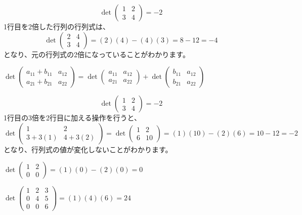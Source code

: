 \begin{ex}
	\[\det\begin{pmatrix} 1 & 2 \\ 3 & 4 \end{pmatrix} = -2\]
    1行目を2倍した行列の行列式は、
    \[\det\begin{pmatrix} 2 & 4 \\ 3 & 4 \end{pmatrix} = (2)(4)-(4)(3) = 8-12=-4\]
    となり、元の行列式の2倍になっていることがわかります。
\end{ex}

\begin{ex}
    $\det\begin{pmatrix} a_{11}+b_{11} & a_{12} \\ a_{21}+b_{21} & a_{22} \end{pmatrix} = \det\begin{pmatrix} a_{11} & a_{12} \\ a_{21} & a_{22} \end{pmatrix} + \det\begin{pmatrix} b_{11} & a_{12} \\ b_{21} & a_{22} \end{pmatrix}$
\end{ex}

\begin{ex}
    \[\det\begin{pmatrix} 1 & 2 \\ 3 & 4 \end{pmatrix} = -2\]
    1行目の3倍を2行目に加える操作を行うと、
    \[\det\begin{pmatrix} 1 & 2 \\ 3+3(1) & 4+3(2) \end{pmatrix} = \det\begin{pmatrix} 1 & 2 \\ 6 & 10 \end{pmatrix} = (1)(10)-(2)(6) = 10-12=-2\]
    となり、行列式の値が変化しないことがわかります。
\end{ex}

\begin{ex}
    $\det\begin{pmatrix} 1 & 2 \\ 0 & 0 \end{pmatrix} = (1)(0)-(2)(0)=0$
\end{ex}

\begin{ex}
    $\det\begin{pmatrix} 1 & 2 & 3 \\ 0 & 4 & 5 \\ 0 & 0 & 6 \end{pmatrix} = (1)(4)(6) = 24$
\end{ex}

